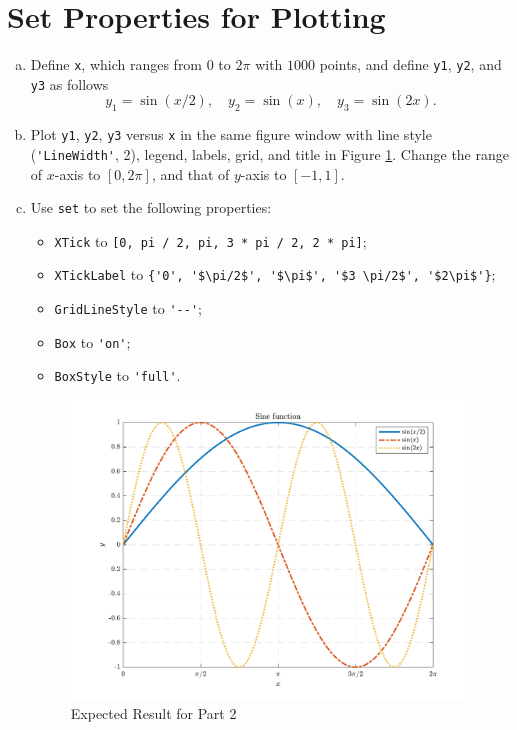 \section{Set Properties for Plotting}
\begin{enumerate}[(a)]
    \item Define \verb|x|, which ranges from $0$ to $2\pi$ with $1000$ points, and define \verb|y1|, \verb|y2|, and \verb|y3| as follows
        $$
        y_1 = \sin(x/2), \quad
        y_2 = \sin(x), \quad
        y_3 = \sin(2x).
        $$
    \item Plot \verb|y1|, \verb|y2|, \verb|y3| versus \verb|x| in the same figure window with line style (\verb|'LineWidth'|, 2), legend, labels, grid, and title in Figure \ref{fig:2}. Change the range of $x$-axis to $[0, 2\pi]$, and that of $y$-axis to $[-1, 1]$.
\item Use \verb|set| to set the following properties:
    \begin{itemize}
        \item \verb|XTick| to \verb|[0, pi / 2, pi, 3 * pi / 2, 2 * pi]|;
        \item \verb|XTickLabel| to \verb|{'0', '$\pi/2$', '$\pi$', '$3 \pi/2$', '$2\pi$'}|;
        \item \verb|GridLineStyle| to \verb|'--'|;
        \item \verb|Box| to \verb|'on'|;
        \item \verb|BoxStyle| to \verb|'full'|.
    \end{itemize}
\begin{figure}[!hbtp]
    \centering
    \includegraphics[height=0.27\textheight]{./fig/lab_04_plot_2.pdf}
    \caption{Expected Result for Part 2}
    \label{fig:2}
\end{figure}
\end{enumerate}
